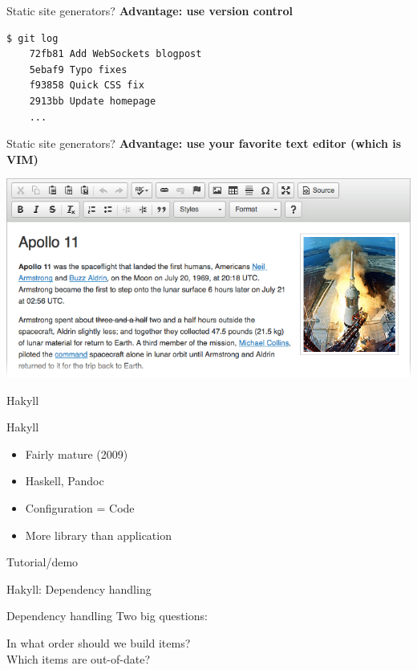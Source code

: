 \documentclass[20pt]{beamer}
\newcommand{\vspaced}{
    \vspace{5mm}
}
\newcommand{\chapterslide}[1]{
    {
        \begin{frame}[plain]
        \begin{center}
        \large{#1}
        \end{center}
        \end{frame}
    }
}
\begin{document}
\begin{frame}[fragile]{Static site generators?}
    \textbf{Advantage: use version control} \\
    \vspaced
    \begin{lstlisting}[language=bash]
    $ git log
    72fb81 Add WebSockets blogpost
    5ebaf9 Typo fixes
    f93858 Quick CSS fix
    2913bb Update homepage
    ...
    \end{lstlisting}
\end{frame}

\begin{frame}{Static site generators?}
    \textbf{Advantage: use your favorite text editor (which is VIM)} \\
    \vspaced
    \includegraphics[width=\textwidth]{images/wysiwyg.png}
\end{frame}

\chapterslide{Hakyll}

\begin{frame}{Hakyll}
    \begin{itemize}
    \item Fairly mature (2009)
    \item Haskell, Pandoc
    \item Configuration = Code
    \item More library than application
    \end{itemize}
\end{frame}

\chapterslide{Tutorial/demo}

\chapterslide{Hakyll: Dependency handling}

\begin{frame}{Dependency handling}
    Two big questions: \\
    \vspaced
    In what order should we build items? \\
    Which items are out-of-date? \\
\end{frame}
\end{document}
